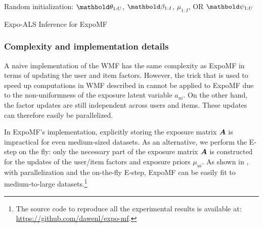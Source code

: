 \begin{algorithm}
\DontPrintSemicolon %
Random initialization: $\mb\theta_{1:U}$, $\mb\beta_{1:I}$, $\mu_{1:I}$, OR $\mb\psi_{1:U}$\;
\;
\caption{{\sc Expo-ALS} Inference for ExpoMF}
\label{chpt:expomf:algo:expomf}
\end{algorithm}

\subsubsection{Complexity and implementation details}\label{chpt:expomf:sec:implmentation}

A naive implementation of the \gls{WMF} has the same complexity as ExpoMF in terms of updating the user and item factors. However, the trick that is used to speed up computations in \gls{WMF} described in  cannot be applied to ExpoMF due to the non-uniformness of the exposure latent variable $a_{ui}$. On the other hand, the factor updates are still independent across users and items. These updates can therefore easily be parallelized.

In ExpoMF's implementation, explicitly storing the exposure matrix $\boldsymbol{A}$ is impractical for even medium-sized datasets. As an alternative, we perform the E-step on the fly: only the necessary part of the exposure matrix $\boldsymbol{A}$ is constructed for the updates of the user/item factors and exposure priors $\mu_{ui}$. As shown in , with parallelization and the on-the-fly E-step, ExpoMF can be easily fit to medium-to-large datasets.\footnote{The source code to reproduce all the experimental results is available at: \url{https://github.com/dawenl/expo-mf}.}

